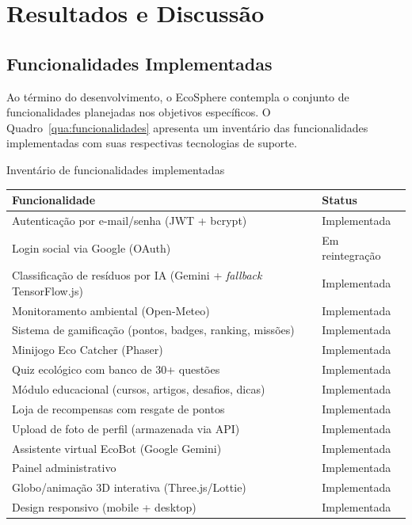 \documentclass[
	12pt,
	openright,
	oneside,
	a4paper,
	chapter=TITLE,
	section=TITLE,
	subsection=TITLE,
	subsubsection=TITLE,
	english,
	brazil
	]{abntex2}
\begin{document}
\chapter{Resultados e Discussão}

\section{Funcionalidades Implementadas}

Ao término do desenvolvimento, o EcoSphere contempla o conjunto de funcionalidades planejadas nos objetivos específicos. O Quadro~\ref{qua:funcionalidades} apresenta um inventário das funcionalidades implementadas com suas respectivas tecnologias de suporte.

\begin{quadro}[htbp]
\caption{Inventário de funcionalidades implementadas}
\label{qua:funcionalidades}
\begin{tabularx}{\textwidth}{|L|l|}
\hline
\textbf{Funcionalidade} & \textbf{Status} \\
\hline
Autenticação por e-mail/senha (JWT + bcrypt) & Implementada \\
\hline
Login social via Google (OAuth) & Em reintegração \\
\hline
Classificação de resíduos por IA (Gemini + \textit{fallback} TensorFlow.js) & Implementada \\
\hline
Monitoramento ambiental (Open-Meteo) & Implementada \\
\hline
Sistema de gamificação (pontos, badges, ranking, missões) & Implementada \\
\hline
Minijogo Eco Catcher (Phaser) & Implementada \\
\hline
Quiz ecológico com banco de 30+ questões & Implementada \\
\hline
Módulo educacional (cursos, artigos, desafios, dicas) & Implementada \\
\hline
Loja de recompensas com resgate de pontos & Implementada \\
\hline
Upload de foto de perfil (armazenada via API) & Implementada \\
\hline
Assistente virtual EcoBot (Google Gemini) & Implementada \\
\hline
Painel administrativo & Implementada \\
\hline
Globo/animação 3D interativa (Three.js/Lottie) & Implementada \\
\hline
Design responsivo (mobile + desktop) & Implementada \\
\hline
\end{tabularx}
\end{quadro}
\end{document}
